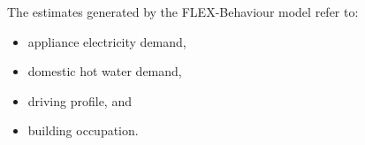The estimates generated by the FLEX-Behaviour model refer to: 
\begin{itemize}
  \item appliance electricity demand,
  \item domestic hot water demand,
  \item driving profile, and
  \item building occupation.
\end{itemize}




